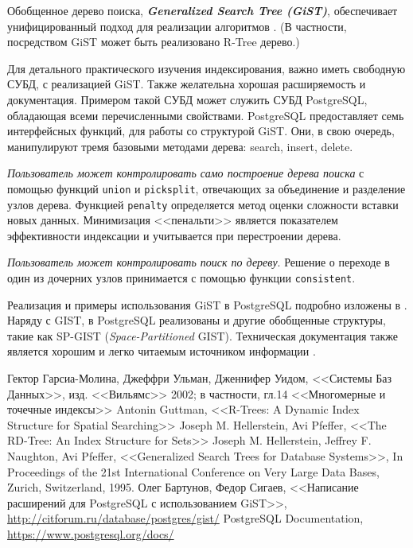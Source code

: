 \documentclass[10pt, a5paper]{article}
\begin{document}
Обобщенное дерево поиска, \textit{\textbf{Generalized Search Tree (GiST)}}, 
обеспечивает унифицированный подход для реализации алгоритмов \cite{GiST}. 
(В частности, посредством GiST может быть реализовано R-Tree дерево.)  

Для детального практического изучения индексирования, важно иметь свободную СУБД,
с реализацией GiST. Также желательна хорошая расширяемость и документация.    
Примером такой СУБД может служить СУБД PostgreSQL, обладающая всеми перечисленными свойствами.
PostgreSQL предоставляет семь интерфейсных функций, для работы со структурой GiST. 
Они, в свою очередь, манипулируют тремя базовыми методами дерева: search, insert, delete.

\textit{Пользователь может контролировать само построение дерева поиска}
с помощью функций \texttt{union} и \texttt{picksplit}, отвечающих за объединение и разделение узлов дерева. 
Функцией \texttt{penalty} определяется метод оценки сложности вставки новых данных.
Минимизация <<пенальти>> является показателем эффективности индексации и учитывается при перестроении дерева.

\textit{Пользователь может контролировать поиск по дереву}. Решение о переходе в один из дочерних узлов 
принимается с помощью функции \texttt{consistent}. 

Реализация и примеры использования GiST в PostgreSQL подробно изложены в \cite{Pg_GiST}. 
Наряду с GIST, в PostgreSQL реализованы и другие обобщенные структуры, такие как SP-GIST (\textit{Space-Partitioned} GIST).
Техническая документация также является хорошим и легко читаемым источником информации \cite{Pg_Docs}. 

\begin{thebibliography}{9}
 Гектор Гарсиа-Молина, Джеффри Ульман, Дженнифер Уидом, <<Системы Баз Данных>>, изд. <<Вильямс>> 2002; 
в частности, гл.14 <<Многомерные и точечные индексы>> 
 Antonin Guttman, <<R-Trees: A Dynamic Index Structure for Spatial Searching>>
 Joseph M. Hellerstein, Avi Pfeffer, <<The RD-Tree: An Index Structure for Sets>>
 Joseph M. Hellerstein, Jeffrey F. Naughton, Avi Pfeffer, <<Generalized Search Trees for Database Systems>>,
In Proceedings of the 21st International Conference on Very Large Data Bases, Zurich, Switzerland, 1995.
 Олег Бартунов, Федор Сигаев, <<Написание расширений для PostgreSQL с использованием GiST>>, \url{http://citforum.ru/database/postgres/gist/}
 PostgreSQL Documentation, \url{https://www.postgresql.org/docs/}
\end{thebibliography}
\end{document}

